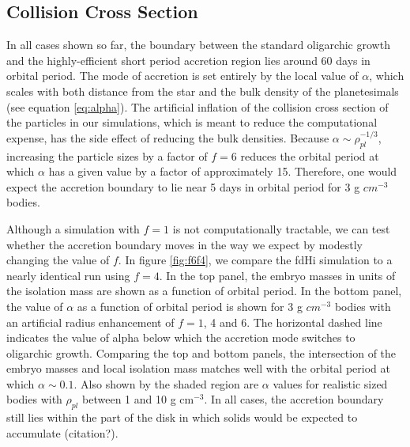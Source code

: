 \documentclass[twocolumn]{aastex63}
\begin{document}
\subsection{Collision Cross Section}

In all cases shown so far, the boundary between the standard
oligarchic growth and the highly-efficient short period accretion
region lies around 60 days in orbital period. The mode of accretion is
set entirely by the local value of $\alpha$, which scales with both
distance from the star and the bulk density of the planetesimals (see
equation \ref{eq:alpha}). The artificial inflation of the collision
cross section of the particles in our simulations, which is meant to
reduce the computational expense, has the side effect of reducing the
bulk densities. Because $\alpha \sim \rho_{pl}^{-1/3}$, increasing the
particle sizes by a factor of $f=6$ reduces the orbital period at which $\alpha$ has a given value by a factor of approximately 15. Therefore, one would expect the accretion boundary to lie near 5 days in orbital period for 3 g $cm^{-3}$ bodies.

Although a simulation with $f=1$ is not computationally tractable, we
can test whether the accretion boundary moves in the way we expect by
modestly changing the value of $f$. In figure \ref{fig:f6f4}, we
compare the fdHi simulation to a nearly identical run using $f=4$. In
the top panel, the embryo masses in units of the isolation mass are
shown as a function of orbital period. In the bottom panel, the value
of $\alpha$ as a function of orbital period is shown for 3 g $cm^{-3}$
bodies with an artificial radius enhancement of $f=1$, 4 and 6. The
horizontal dashed line indicates the value of alpha below which the
accretion mode switches to oligarchic growth. Comparing the top and
bottom panels, the intersection of the embryo masses and local
isolation mass matches well with the orbital period at which $\alpha
\sim 0.1$.  Also shown by the shaded region are $\alpha$ values for
realistic sized bodies with $\rho_{pl}$ between 1 and 10 g cm$^{-3}$.
In all cases, the accretion boundary still lies within the part of the disk in which solids would be expected to accumulate (citation?).
\end{document}
